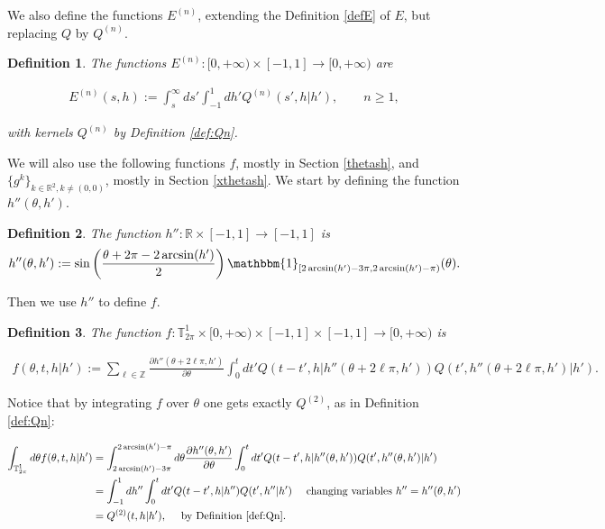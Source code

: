 \documentclass[a4paper,10pt,reqno]{amsart}
\newtheorem{definition}{Definition}[section]
\numberwithin{equation}{subsection}
\numberwithin{figure}{subsection}
\begin{document}
We also define the functions $E^{(n)}$, extending the Definition \ref{defE} of $E$, but replacing $Q$ by $Q^{(n)}$.
\begin{definition}\label{def:En} The functions $E^{(n)}:[0,+\infty)\times[-1,1]\to[0,+\infty)$ are

\begin{align*}
E^{(n)}(s,h):=\int_s^{\infty}ds'\int_{-1}^1dh'Q^{(n)}(s',h|h'),\qquad n\geq1,
\end{align*}

with kernels $Q^{(n)}$ by Definition \ref{def:Qn}.
\end{definition}
We will also use the following functions $f$, mostly in Section \ref{thetash}, and $\{g^k\}_{k\in\mathbb{R}^2,k\neq(0,0)}$, mostly in Section \ref{xthetash}. We start by defining the function $h''(\theta,h')$.
\begin{definition}\label{defh''} The function $h'':\mathbb{R}\times[-1,1]\to[-1,1]$ is
\[
h''(\theta,h'):=\sin\left(\frac{\theta+2\pi-2\arcsin(h')}{2}\right)\mathbbm{1}_{[2\arcsin(h')-3\pi,2\arcsin(h')-\pi)}(\theta).
\]
\end{definition}
Then we use $h''$ to define $f$.
\begin{definition}\label{defeffe}
The function $f:\mathbb{T}^1_{2\pi}\times[0,+\infty)\times[-1,1]\times[-1,1]\to[0,+\infty)$ is

{\footnotesize\begin{align*}
f(\theta,t,h|h'):=\sum_{\ell\in\mathbb{Z}}\frac{\partial h''(\theta+2\ell\pi,h')}{\partial\theta}\int_0^tdt' Q(t-t',h|h''(\theta+2\ell\pi,h'))Q(t',h''(\theta+2\ell\pi,h')|h').
\end{align*}}

\end{definition}
Notice that by integrating $f$ over $\theta$ one gets exactly $Q^{(2)}$, as in Definition \ref{def:Qn}:

{\scriptsize\begin{align}
\nonumber\int_{\mathbb{T}^1_{2\pi}}d\theta f(\theta,t,h|h')&=\int_{2\arcsin(h')-3\pi}^{2\arcsin(h')-\pi}d\theta\frac{\partial h''(\theta,h')}{\partial\theta}\int_0^tdt' Q(t-t',h|h''(\theta,h'))Q(t',h''(\theta,h')|h')
\\
\nonumber&=\int_{-1}^1dh''\int_0^tdt'Q(t-t',h|h'')Q(t',h''|h')\quad\textrm{ changing variables }h''=h''(\theta,h')
\\
\label{intfQ2}&=Q^{(2)}(t,h|h'),\quad\textrm{ by Definition \ref{def:Qn}}.
\end{align}}
\end{document}
